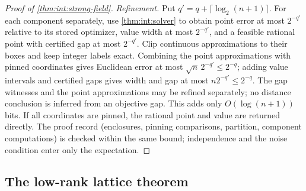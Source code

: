 \begin{proof}[Proof of \cref{thm:int:strong-field}]
\emph{Refinement.} Put
$q'=q+\lceil\log_2(n+1)\rceil$. For each component separately, use
\cref{thm:int:solver} to obtain point error at most $2^{-q'}$ relative to
its stored optimizer, value width at most $2^{-q'}$, and a feasible
rational point with certified gap at most $2^{-q'}$. Clip continuous
approximations to their boxes and keep integer labels exact. Combining the
point approximations with pinned coordinates gives Euclidean error at most
$\sqrt n\,2^{-q'}\le2^{-q}$; adding value intervals and certified gaps
gives width and gap at most $n2^{-q'}\le2^{-q}$. The gap witnesses and the
point approximations may be refined separately; no distance conclusion is
inferred from an objective gap. This adds only $O(\log(n+1))$ bits. If all
coordinates are pinned, the rational point and value are returned directly.
The proof
record (enclosures, pinning comparisons, partition, component computations) is
checked within the same bound; independence and the noise condition enter only the
expectation.
\end{proof}

\subsection{The low-rank lattice theorem}\label{app:int:lowrank}


